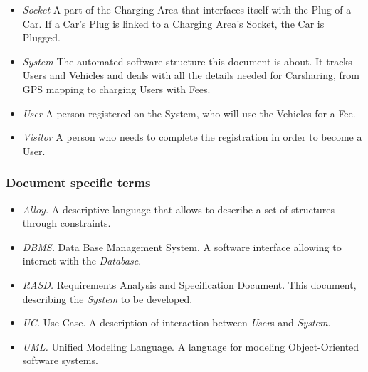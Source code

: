 \begin{itemize}
	\item \emph{Socket}
	A part of the Charging Area that interfaces itself with the Plug of a Car. If a Car's Plug is linked to a Charging Area's Socket, the Car is Plugged.

	\item \emph{System}
	The automated software structure this document is about.
	It tracks Users and Vehicles and deals with all the details needed for Carsharing, from GPS mapping to charging Users with Fees.

	\item \emph{User}
	A person registered on the System, who will use the Vehicles for a Fee.

	\item \emph{Visitor}
	A person who needs to complete the registration in order to become a User.
\end{itemize}

\subsubsection{Document specific terms}
\begin{itemize}
	\item \emph{Alloy.}
	A descriptive language that allows to describe a set of structures through constraints.
	\item \emph{DBMS.}
	Data Base Management System. A software interface allowing to interact with the \emph{Database}.
	\item \emph{RASD.}
	Requirements Analysis and Specification Document. This document, describing the \emph{System} to be developed.
	\item \emph{UC.}
	Use Case. A description of interaction between \emph{User}s and \emph{System}.
	\item \emph{UML.}
	Unified Modeling Language. A language for modeling Object-Oriented software systems.
\end{itemize}